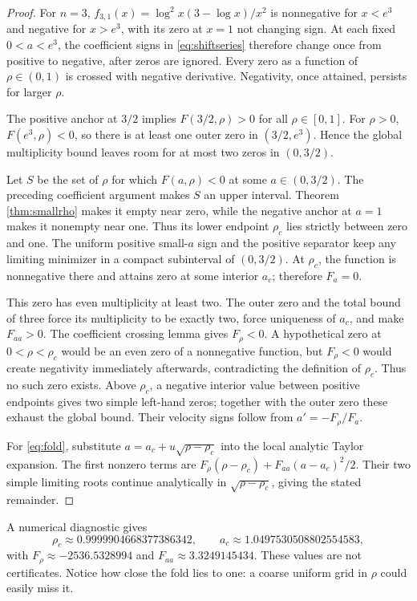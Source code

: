 \documentclass[11pt]{article}
\numberwithin{equation}{section}
\theoremstyle{definition}\newtheorem{definition}[theorem]{Definition}
\theoremstyle{remark}\newtheorem{remark}[theorem]{Remark}
\begin{document}
\begin{proof}
For $n=3$,
$f_{3,1}(x)=\log^2x(3-\log x)/x^2$ is nonnegative for $x<e^3$ and negative for $x>e^3$, with its zero at $x=1$ not changing sign. At each fixed $0<a<e^3$, the coefficient signs in \eqref{eq:shiftseries} therefore change once from positive to negative, after zeros are ignored. Every zero as a function of $\rho\in(0,1)$ is crossed with negative derivative. Negativity, once attained, persists for larger $\rho$.

The positive anchor at $3/2$ implies $F(3/2,\rho)>0$ for all $\rho\in[0,1]$. For $\rho>0$, $F(e^3,\rho)<0$, so there is at least one outer zero in $(3/2,e^3)$. Hence the global multiplicity bound leaves room for at most two zeros in $(0,3/2)$.

Let $S$ be the set of $\rho$ for which $F(a,\rho)<0$ at some $a\in(0,3/2)$. The preceding coefficient argument makes $S$ an upper interval. Theorem \ref{thm:smallrho} makes it empty near zero, while the negative anchor at $a=1$ makes it nonempty near one. Thus its lower endpoint $\rho_c$ lies strictly between zero and one. The uniform positive small-$a$ sign and the positive separator keep any limiting minimizer in a compact subinterval of $(0,3/2)$. At $\rho_c$, the function is nonnegative there and attains zero at some interior $a_c$; therefore $F_a=0$.

This zero has even multiplicity at least two. The outer zero and the total bound of three force its multiplicity to be exactly two, force uniqueness of $a_c$, and make $F_{aa}>0$. The coefficient crossing lemma gives $F_\rho<0$. A hypothetical zero at $0<\rho<\rho_c$ would be an even zero of a nonnegative function, but $F_\rho<0$ would create negativity immediately afterwards, contradicting the definition of $\rho_c$. Thus no such zero exists. Above $\rho_c$, a negative interior value between positive endpoints gives two simple left-hand zeros; together with the outer zero these exhaust the global bound. Their velocity signs follow from $a'=-F_\rho/F_a$.

For \eqref{eq:fold}, substitute $a=a_c+u\sqrt{\rho-\rho_c}$ into the local analytic Taylor expansion. The first nonzero terms are $F_\rho(\rho-\rho_c)+F_{aa}(a-a_c)^2/2$. Their two simple limiting roots continue analytically in $\sqrt{\rho-\rho_c}$, giving the stated remainder.
\end{proof}

A numerical diagnostic gives
\[
\rho_c\approx0.9999904668377386342,\qquad a_c\approx1.0497530508802554583,
\]
with $F_\rho\approx-2536.5328994$ and $F_{aa}\approx3.3249145434$. These values are not certificates. Notice how close the fold lies to one: a coarse uniform grid in $\rho$ could easily miss it.
\end{document}
